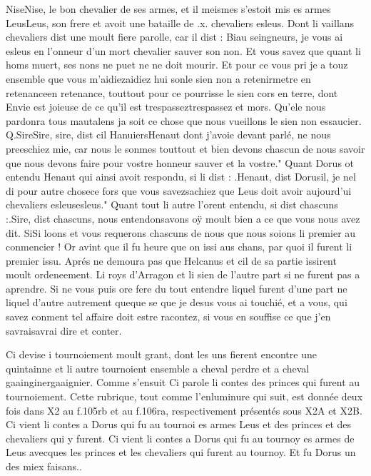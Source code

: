 \documentclass{article}
\begin{document}
\begin{pages}
      NiseNise, le bon chevalier de ses armes, 
   et il meismes s’estoit mis es armes 
   LeusLeus, 
      son frere et avoit une bataille de .x. chevaliers esleus.
   Dont li vaillans chevaliers dist une moult fiere parolle, car il dist :
   Biau seingneurs, je vous ai esleus en l’onneur d’un mort chevalier sauver son
      non. Et vous savez que quant li homs muert, ses nons ne puet ne ne doit mourir. 
      Et pour ce vous pri je a touz ensemble que vous m’aidiezaidiez hui 
      sonle sien non a 
      retenirmetre en retenanceen retenance, 
      touttout pour ce pourrisse le 
      sien cors en terre, 
      dont Envie est joieuse de ce qu’il est trespasseztrespassez et mors.
      Qu'ele nous pardonra tous mautalens ja soit ce chose que nous vueillons le sien non essaucier. Q.SireSire, sire, dist 
      cil HanuiersHenaut
      dont j’avoie devant parlé, ne nous preeschiez mie, car nous le sonmes 
      touttout et bien devons chascun de nous savoir que nous devons faire 
      pour vostre honneur sauver et la vostre." Quant Dorus ot entendu Henaut qui ainsi avoit respondu, si li dist : .Henaut, dist 
      Dorusil,
      je nel di pour autre chosece fors que vous 
      savezsachiez que 
      Leus doit avoir aujourd’ui chevaliers 
      esleusesleus." Quant tout li autre l'orent entendu, si dist chascuns :.Sire, dist chascuns, 
      nous entendonsavons oÿ 
      moult bien a ce que vous nous avez dit.
      SiSi loons et vous requerons chascuns de nous que nous 
      soions li premier au conmencier !
   Or avint que il fu heure que on issi aus chans, par quoi il furent li premier issu. \pend
\pstart Aprés ne demoura pas que 
   Helcanus et cil de sa partie issirent moult 
   ordeneement. Li roys d’Arragon et li sien de l’autre part si 
   ne furent pas a aprendre. Si ne vous puis ore fere du tout entendre liquel furent d’une part ne liquel d’autre 
   autrement queque se
      que je desus vous ai touchié, et a vous, 
      qui savez conment tel affaire doit estre racontez, si vous en souffise ce que j’en 
      savraisavrai dire et conter. \pend
         
         
            Ci devise i tournoiement moult grant, 
               dont les uns fierent encontre une quintainne et li autre tournoient ensemble 
               a cheval perdre et a cheval gaainginergaaignier. 
                  Comme s'ensuit
               Ci parole li contes des princes qui furent au tournoiement.
               Cette rubrique, tout comme l'enluminure qui suit, est donnée deux fois dans X2
                  au f.105rb et au f.106ra, respectivement présentés sous X2A et X2B.
               Ci vient li contes a Dorus qui fu au tournoi es armes Leus et des princes et des chevaliers qui y furent.
               Ci vient li contes a Dorus qui fu au tournoy es armes de Leus avecques les princes et les chevaliers qui
               furent au tournoy. Et fu Dorus un des miex faisans..
            

\end{pages}
\end{document}
